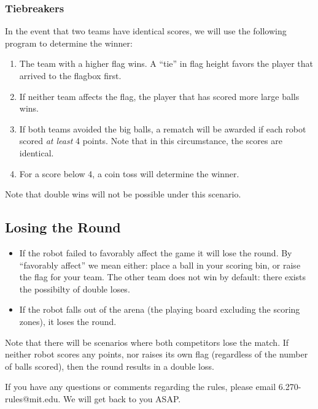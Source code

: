 \subsubsection{Tiebreakers}

In the event that two teams have identical scores, we will use the following program to determine the winner:

\begin{enumerate}
\item The team with a higher flag wins. A ``tie'' in flag height favors the player that arrived to the flagbox first.
\item If neither team affects the flag, the player that has scored more large balls wins.
\item If both teams avoided the big balls, a rematch will be awarded if each robot scored \emph{at least} 4 points. Note that in this circumstance, the scores are identical.
\item For a score below 4, a coin toss will determine the winner. 
\end{enumerate}

Note that double wins will not be possible under this scenario.

\subsection{Losing the Round}

\begin{itemize}
\item If the robot failed to favorably affect the game it will lose the round. By ``favorably affect'' we mean either: place a ball in your scoring bin, or raise the flag for your team. The other team does not win by default: there exists the possibilty of double loses.

\item If the robot falls out of the arena (the playing board excluding the scoring zones), it loses the round.
\end{itemize}

Note that there will be scenarios where both competitors lose the match. If neither robot scores any points, nor raises its own flag (regardless of the number of balls scored), then the round results in a double loss.

If you have any questions or comments regarding the rules, please email 6.270-rules@mit.edu. We will get back to you ASAP.


